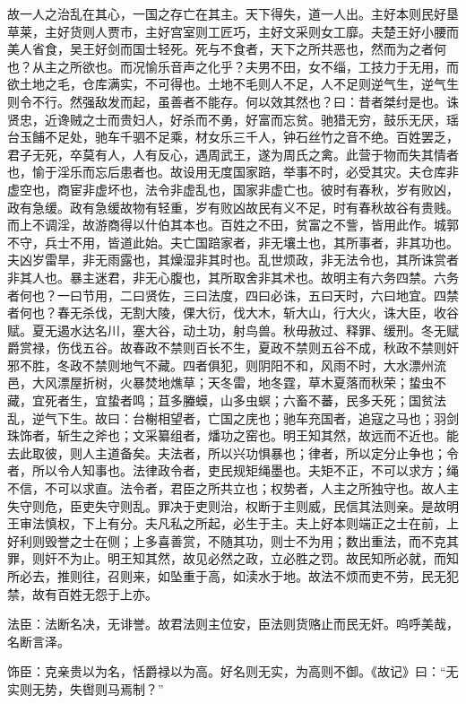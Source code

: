 \documentclass[]{article}
\begin{document}
故一人之治乱在其心，一国之存亡在其主。天下得失，道一人出。主好本则民好垦草莱，主好货则人贾市，主好宫室则工匠巧，主好文采则女工靡。夫楚王好小腰而美人省食，吴王好剑而国士轻死。死与不食者，天下之所共恶也，然而为之者何也？从主之所欲也。而况愉乐音声之化乎？夫男不田，女不缁，工技力于无用，而欲土地之毛，仓库满实，不可得也。土地不毛则人不足，人不足则逆气生，逆气生则令不行。然强敌发而起，虽善者不能存。何以效其然也？曰：昔者桀纣是也。诛贤忠，近谗贼之士而贵妇人，好杀而不勇，好富而忘贫。驰猎无穷，鼓乐无厌，瑶台玉餔不足处，驰车千驷不足乘，材女乐三千人，钟石丝竹之音不绝。百姓罢乏，君子无死，卒莫有人，人有反心，遇周武王，遂为周氏之禽。此营于物而失其情者也，愉于淫乐而忘后患者也。故设用无度国家踣，举事不时，必受其灾。夫仓库非虚空也，商宦非虚坏也，法令非虚乱也，国家非虚亡也。彼时有春秋，岁有败凶，政有急缓。政有急缓故物有轻重，岁有败凶故民有义不足，时有春秋故谷有贵贱。而上不调淫，故游商得以什伯其本也。百姓之不田，贫富之不訾，皆用此作。城郭不守，兵士不用，皆道此始。夫亡国踣家者，非无壤土也，其所事者，非其功也。夫凶岁雷旱，非无雨露也，其燥湿非其时也。乱世烦政，非无法令也，其所诛赏者非其人也。暴主迷君，非无心腹也，其所取舍非其术也。故明主有六务四禁。六务者何也？一曰节用，二曰贤佐，三曰法度，四曰必诛，五曰天时，六曰地宜。四禁者何也？春无杀伐，无割大陵，倮大衍，伐大木，斩大山，行大火，诛大臣，收谷赋。夏无遏水达名川，塞大谷，动土功，射鸟兽。秋毋赦过、释罪、缓刑。冬无赋爵赏禄，伤伐五谷。故春政不禁则百长不生，夏政不禁则五谷不成，秋政不禁则奸邪不胜，冬政不禁则地气不藏。四者俱犯，则阴阳不和，风雨不时，大水漂州流邑，大风漂屋折树，火暴焚地燋草；天冬雷，地冬霆，草木夏落而秋荣；蛰虫不藏，宜死者生，宜蛰者鸣；苴多螣蟆，山多虫螟；六畜不蕃，民多夭死；国贫法乱，逆气下生。故曰：台榭相望者，亡国之庑也；驰车充国者，追寇之马也；羽剑珠饰者，斩生之斧也；文采纂组者，燔功之窑也。明王知其然，故远而不近也。能去此取彼，则人主道备矣。夫法者，所以兴功惧暴也；律者，所以定分止争也；令者，所以令人知事也。法律政令者，吏民规矩绳墨也。夫矩不正，不可以求方；绳不信，不可以求直。法令者，君臣之所共立也；权势者，人主之所独守也。故人主失守则危，臣吏失守则乱。罪决于吏则治，权断于主则威，民信其法则亲。是故明王审法慎权，下上有分。夫凡私之所起，必生于主。夫上好本则端正之士在前，上好利则毁誉之士在侧；上多喜善赏，不随其功，则士不为用；数出重法，而不克其罪，则奸不为止。明王知其然，故见必然之政，立必胜之罚。故民知所必就，而知所必去，推则往，召则来，如坠重于高，如渎水于地。故法不烦而吏不劳，民无犯禁，故有百姓无怨于上亦。

法臣：法断名决，无诽誉。故君法则主位安，臣法则货赂止而民无奸。呜呼美哉，名断言泽。

饰臣：克亲贵以为名，恬爵禄以为高。好名则无实，为高则不御。《故记》曰：``无实则无势，失辔则马焉制？''
\end{document}
